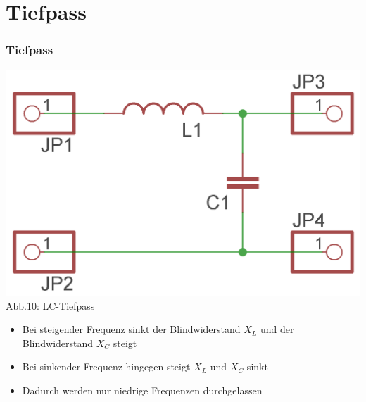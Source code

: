 \section*{Tiefpass}
\begin{frame}
\frametitle{Tiefpass}
\begin{center}
	\includegraphics[scale=1.2]{a04/LC-Tiefpass.png}\\
	Abb.10: LC-Tiefpass
\end{center}
\begin{itemize}
	\item Bei steigender Frequenz sinkt der Blindwiderstand $X_L$ und der Blindwiderstand $X_C$ steigt
	\item Bei sinkender Frequenz hingegen steigt $X_L$ und $X_C$ sinkt
	\item Dadurch werden nur niedrige Frequenzen durchgelassen 
\end{itemize}
\end{frame}

